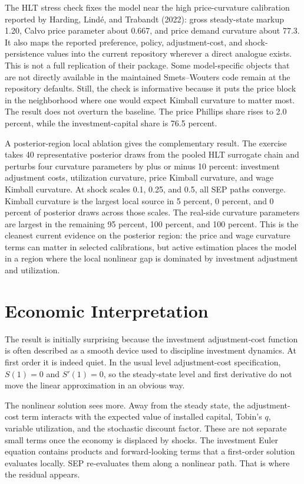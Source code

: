 \documentclass[10pt]{article}
\begin{document}
The HLT stress check fixes the model near the high price-curvature calibration reported by Harding, Lind\'e, and Trabandt (2022): gross steady-state markup 1.20, Calvo price parameter about 0.667, and price demand curvature about 77.3. It also maps the reported preference, policy, adjustment-cost, and shock-persistence values into the current repository wherever a direct analogue exists. This is not a full replication of their package. Some model-specific objects that are not directly available in the maintained Smets--Wouters code remain at the repository defaults. Still, the check is informative because it puts the price block in the neighborhood where one would expect Kimball curvature to matter most. The result does not overturn the baseline. The price Phillips share rises to 2.0 percent, while the investment-capital share is 76.5 percent.

A posterior-region local ablation gives the complementary result. The exercise takes 40 representative posterior draws from the pooled HLT surrogate chain and perturbs four curvature parameters by plus or minus 10 percent: investment adjustment costs, utilization curvature, price Kimball curvature, and wage Kimball curvature. At shock scales 0.1, 0.25, and 0.5, all SEP paths converge. Kimball curvature is the largest local source in 5 percent, 0 percent, and 0 percent of posterior draws across those scales. The real-side curvature parameters are largest in the remaining 95 percent, 100 percent, and 100 percent. This is the cleanest current evidence on the posterior region: the price and wage curvature terms can matter in selected calibrations, but active estimation places the model in a region where the local nonlinear gap is dominated by investment adjustment and utilization.

\section*{Economic Interpretation}

The result is initially surprising because the investment adjustment-cost function is often described as a smooth device used to discipline investment dynamics. At first order it is indeed quiet. In the usual level adjustment-cost specification, $S(1)=0$ and $S'(1)=0$, so the steady-state level and first derivative do not move the linear approximation in an obvious way.

The nonlinear solution sees more. Away from the steady state, the adjustment-cost term interacts with the expected value of installed capital, Tobin's $q$, variable utilization, and the stochastic discount factor. These are not separate small terms once the economy is displaced by shocks. The investment Euler equation contains products and forward-looking terms that a first-order solution evaluates locally. SEP re-evaluates them along a nonlinear path. That is where the residual appears.
\end{document}
